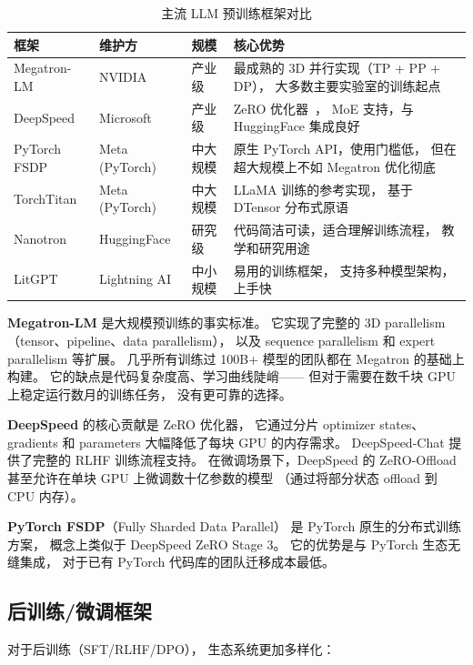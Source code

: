 \begin{table}[H]
\centering\small
\caption{主流 LLM 预训练框架对比}
\begin{tabularx}{\linewidth}{l l l X}
\toprule
\textbf{框架} & \textbf{维护方} & \textbf{规模} & \textbf{核心优势} \\
\midrule
Megatron-LM & NVIDIA & 产业级 &
  最成熟的 3D 并行实现（TP + PP + DP），
  大多数主要实验室的训练起点 \\
DeepSpeed   & Microsoft & 产业级 &
  ZeRO 优化器~\cite{rajbhandari2020zero}，
  MoE 支持，与 HuggingFace 集成良好 \\
PyTorch FSDP & Meta (PyTorch) & 中大规模 &
  原生 PyTorch API，使用门槛低，
  但在超大规模上不如 Megatron 优化彻底 \\
TorchTitan  & Meta (PyTorch) & 中大规模 &
  LLaMA 训练的参考实现，
  基于 DTensor 分布式原语 \\
Nanotron    & HuggingFace & 研究级 &
  代码简洁可读，适合理解训练流程，
  教学和研究用途 \\
LitGPT      & Lightning AI & 中小规模 &
  易用的训练框架，
  支持多种模型架构，上手快 \\
\bottomrule
\end{tabularx}
\end{table}

\textbf{Megatron-LM} 是大规模预训练的事实标准。
它实现了完整的 3D parallelism（tensor、pipeline、data parallelism），
以及 sequence parallelism 和 expert parallelism 等扩展。
几乎所有训练过 100B+ 模型的团队都在 Megatron 的基础上构建。
它的缺点是代码复杂度高、学习曲线陡峭——
但对于需要在数千块 GPU 上稳定运行数月的训练任务，
没有更可靠的选择。

\textbf{DeepSpeed} 的核心贡献是 ZeRO 优化器，
它通过分片 optimizer states、gradients 和 parameters
大幅降低了每块 GPU 的内存需求。
DeepSpeed-Chat 提供了完整的 RLHF 训练流程支持。
在微调场景下，DeepSpeed 的 ZeRO-Offload
甚至允许在单块 GPU 上微调数十亿参数的模型
（通过将部分状态 offload 到 CPU 内存）。

\textbf{PyTorch FSDP}（Fully Sharded Data Parallel）
是 PyTorch 原生的分布式训练方案，
概念上类似于 DeepSpeed ZeRO Stage 3。
它的优势是与 PyTorch 生态无缝集成，
对于已有 PyTorch 代码库的团队迁移成本最低。

\subsection{后训练/微调框架}

对于后训练（SFT/RLHF/DPO），
生态系统更加多样化：

